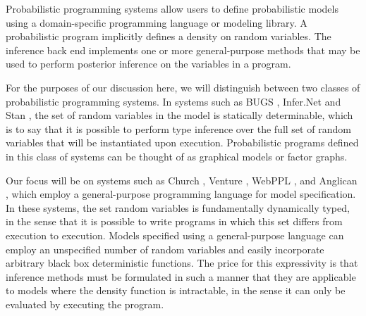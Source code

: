 Probabilistic programming systems allow users to define probabilistic models using a domain-specific programming language or modeling library. A probabilistic program implicitly defines a density on random variables. The inference back end implements one or more general-purpose methods that may be used to perform posterior inference on the variables in a program.

For the purposes of our discussion here, we will distinguish between two classes of probabilistic programming systems.  In systems such as BUGS \citep{spiegelhalter1996bugs}, Infer.Net \citep{minka_software_2010} and Stan \citep{carpenter2015stan}, the set of random variables in the model is statically determinable, which is to say that it is possible to perform type inference over the full set of random variables that will be instantiated upon execution. Probabilistic programs defined in this class of systems can be thought of as graphical models or factor graphs. 

Our focus will be on systems such as Church \citep{goodman_uai_2008}, Venture \citep{mansinghka2014venture}, WebPPL \citep{goodman_book_2014}, and Anglican \citep{wood2014new}, which employ a general-purpose programming language for model specification. In these systems, the set random variables is fundamentally dynamically typed, in the sense that it is possible to write programs in which this set differs from execution to execution. Models specified using a general-purpose language can employ an unspecified number of random variables and easily incorporate arbitrary black box deterministic functions. The price for this expressivity is that inference methods must be formulated in such a manner that they are applicable to models where the density function is intractable, in the sense it can only be evaluated by executing the program. 